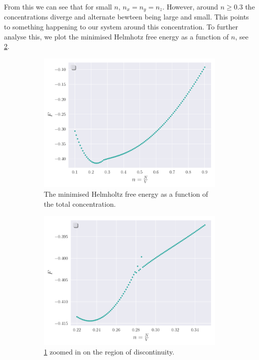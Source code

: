     From this we can see that for small $n$, $n_x=n_y=n_z$. However, around $n \geq 0.3$ the concentrations diverge and alternate bewteen being large and small. This points to something happening to our system around this concentration. To further analyse this, we plot the minimised Helmhotz free energy as a function of $n$, see \cref{fig:n_vs_F}.    
    \begin{figure}
        \centering
        \begin{subfigure}[b]{0.49\textwidth}
            \includegraphics[width=\textwidth]{./figs/n_vs_F.pdf}
            \caption{The minimised Helmholtz free energy as a function of the total concentration.}
            \label{fig:n_vs_F_a}
        \end{subfigure}
        \begin{subfigure}[b]{0.49\textwidth}
            \includegraphics[width=\textwidth]{./figs/n_vs_F_zoomed.pdf}
            \caption{\cref{fig:n_vs_F_a} zoomed in on the region of discontinuity.\linebreak}
        \end{subfigure}
        \caption{}
        \label{fig:n_vs_F}
    \end{figure}
